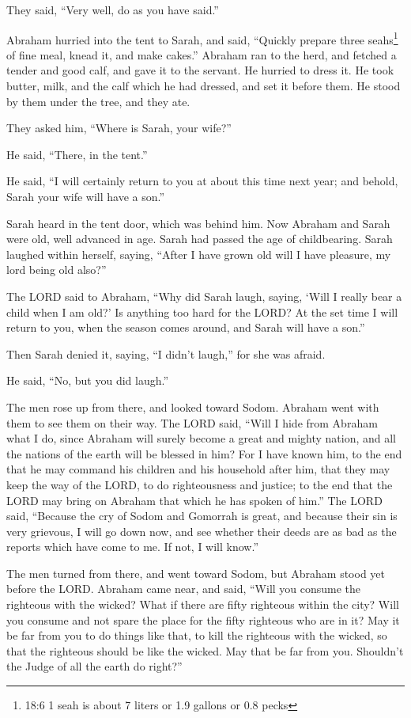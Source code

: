 They said, “Very well, do as you have said.”

\myverse{}Abraham hurried into the tent to Sarah, and said, “Quickly prepare three seahs\footnote{18:6 1 seah is about 7 liters or 1.9 gallons or 0.8 pecks} of fine meal, knead it, and make cakes.” \myverse{}Abraham ran to the herd, and fetched a tender and good calf, and gave it to the servant. He hurried to dress it. \myverse{}He took butter, milk, and the calf which he had dressed, and set it before them. He stood by them under the tree, and they ate.

\myverse{}They asked him, “Where is Sarah, your wife?”

He said, “There, in the tent.”

\myverse{}He said, “I will certainly return to you at about this time next year; and behold, Sarah your wife will have a son.”

Sarah heard in the tent door, which was behind him. \myverse{}Now Abraham and Sarah were old, well advanced in age. Sarah had passed the age of childbearing. \myverse{}Sarah laughed within herself, saying, “After I have grown old will I have pleasure, my lord being old also?”

\myverse{}The LORD said to Abraham, “Why did Sarah laugh, saying, ‘Will I really bear a child when I am old?’ \myverse{}Is anything too hard for the LORD? At the set time I will return to you, when the season comes around, and Sarah will have a son.”

\myverse{}Then Sarah denied it, saying, “I didn’t laugh,” for she was afraid.

He said, “No, but you did laugh.”

\myverse{}The men rose up from there, and looked toward Sodom. Abraham went with them to see them on their way. \myverse{}The LORD said, “Will I hide from Abraham what I do, \myverse{}since Abraham will surely become a great and mighty nation, and all the nations of the earth will be blessed in him? \myverse{}For I have known him, to the end that he may command his children and his household after him, that they may keep the way of the LORD, to do righteousness and justice; to the end that the LORD may bring on Abraham that which he has spoken of him.” \myverse{}The LORD said, “Because the cry of Sodom and Gomorrah is great, and because their sin is very grievous, \myverse{}I will go down now, and see whether their deeds are as bad as the reports which have come to me. If not, I will know.”

\myverse{}The men turned from there, and went toward Sodom, but Abraham stood yet before the LORD. \myverse{}Abraham came near, and said, “Will you consume the righteous with the wicked? \myverse{}What if there are fifty righteous within the city? Will you consume and not spare the place for the fifty righteous who are in it? \myverse{}May it be far from you to do things like that, to kill the righteous with the wicked, so that the righteous should be like the wicked. May that be far from you. Shouldn’t the Judge of all the earth do right?”

